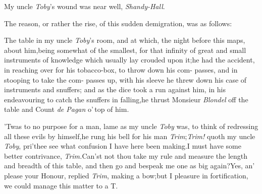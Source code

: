 \documentclass{article}
\begin{document}
My uncle \textit{Toby}’s wound was near well,
\textit{Shandy-Hall}.

The reason, or rather the rise, of this sudden demigration, was as
follows:

The table in my uncle \textit{Toby}’s room, and at which,
the night before this\break 
{}
maps, \etc about him,\tsk being somewhat\break
of the smallest, for that infinity of great\break
and small instruments of knowledge\break
which usually lay crouded upon it;\tsk he\break
had the accident, in reaching over for\break
his tobacco-box, to throw down his com-\break
passes, and in stooping to take the com-\break
passes up, with his sleeve he threw down\break
his case of instruments and snuffers;\tsk\break
and as the dice took a run against him,\break
in his endeavouring to catch the snuffers in
falling,\tsh he thrust Monsieur \textit{Blondel} off the
table and Count \textit{de Pagan} o’\,top\break
of him.

’Twas to no purpose for a man, lame as my uncle
\textit{Toby} was, to think of redres\-sing all these evils by
himself,\tsk he rung his bell for his man
\textit{Trim};\tsk \textit{Trim!} quoth my uncle \textit{Toby},
pri’thee see what
confusion I have here been making.\tsk I must have some better
contrivance, \textit{Trim.}\tsk\break Can’st not thou take my rule
and measure the length and breadth of this table, and then go and
bespeak me one as big again?\tsk Yes, an’ please
your \hbox{Honour,} replied \textit{Trim}, making a bow;\tsk but I\break 
{}
pleasure in
fortification, we could ma\-nage this matter to a T.
\end{document}
